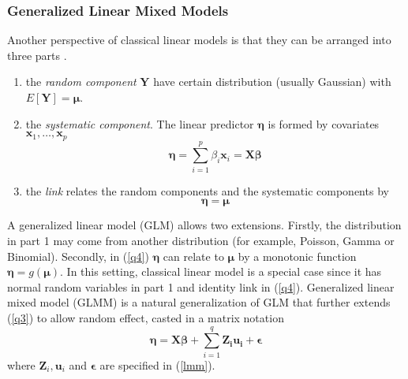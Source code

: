 	\subsubsection{Generalized Linear Mixed Models}
	Another perspective of classical linear models is that they can be arranged into three parts \citep[Chapter 2]{mccullagh1989generalized} .
	\begin{enumerate}
		\item the \textit{random component} $\bm Y$ have certain distribution (usually Gaussian) with $E[\bm Y]= \bm \mu$.
		\item the \textit{systematic component}. The linear predictor $\bm \eta$ is formed by covariates $\bm x_1,\ldots, \bm x_p$ 
		\begin{equation}\label{q3}
		\bm \eta = \sum_{i=1}^p\beta_i\bm x_i=\bm {X\beta}
		\end{equation}
		\item the \textit{link} relates the random components and the systematic components by 
		\begin{equation}\label{q4}
		\bm \eta = \bm \mu
		\end{equation}
	\end{enumerate}
	A generalized linear model (GLM) allows two extensions. Firstly, the distribution in part 1 may come from another distribution (for example, Poisson, Gamma or Binomial). Secondly, in (\ref{q4}) $\bm \eta $ can relate to  $\bm\mu$ by a monotonic function $\bm \eta = g(\bm \mu)$. In this setting, classical linear model is a special case since it has normal random variables in part 1 and identity link in (\ref{q4}). 
	Generalized linear mixed model (GLMM) is a natural generalization of GLM  that further extends (\ref{q3}) to allow random effect, casted in a matrix notation
	\begin{equation}\label{q5}
	\bm \eta = \bm {X\beta} + \sum_{i=1}^q\bm {Z_iu_i} + \bm \epsilon
	\end{equation}
	where  $\bm Z_i, \bm u_i$ and $\bm \epsilon$ are specified in  (\ref{lmm}). \\
